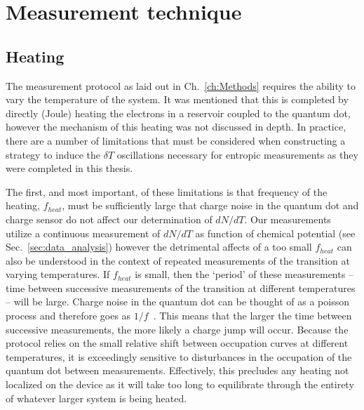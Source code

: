 \chapter{Measurement technique}
\section{Heating}
\label{sec:heating}

The measurement protocol as laid out in Ch.~\ref{ch:Methods} requires the ability to vary the temperature of the system. It was mentioned that this is completed by directly (Joule) heating the electrons in a reservoir coupled to the quantum dot, however the mechanism of this heating was not discussed in depth. In practice, there are a number of limitations that must be considered when constructing a strategy to induce the $\delta T$ oscillations necessary for entropic measurements as they were completed in this thesis. 

The first, and most important, of these limitations is that frequency of the heating, $f_{heat}$, must be sufficiently large that charge noise in the quantum dot and charge sensor do not affect our determination of $dN/dT$. Our measurements utilize a continuous measurement of $dN/dT$ as function of chemical potential (see Sec.~\ref{sec:data_analysis}) however the detrimental affects of a too small $f_{heat}$ can also be understood in the context of repeated measurements of the transition at varying temperatures. If $f_{heat}$ is small, then the `period' of these measurements -- time between successive measurements of the transition at different temperatures -- will be large. Charge noise in the quantum dot can be thought of as a poisson process and therefore goes as $1/f$~\cite{fujisawa2000charge}. This means that the larger the time between successive measurements, the more likely a charge jump will occur. Because the protocol relies on the small relative shift between occupation curves at different temperatures, it is exceedingly sensitive to disturbances in the occupation of the quantum dot between measurements. Effectively, this precludes any heating not localized on the device as it will take too long to equilibrate through the entirety of whatever larger system is being heated. 


